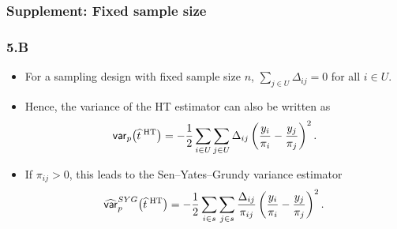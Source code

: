 \documentclass{my_eth_beamer}
\numberwithin{equation}{section}
\newcommand{\NR}{5}
\begin{document}
\subsubsection{Supplement: Fixed sample size}
\begin{frame}
    \frametitle{\NR.\insertsubsectionnumber B~\insertsubsubsection}
    \begin{itemize}
    \setlength{\itemsep}{12pt}
        \item For a sampling design with \alert{fixed sample size} $n$,
            $\sum_{j\in U}\Delta_{ij}=0$ for all $i\in U$.
        \item Hence, the variance of the HT estimator can also be written as
            \begin{equation*}
                \mathsf{var}_p\big(\widehat{t}^{\;\mathrm{HT}}\big) = -\frac{1}{2}
                \sum_{i\in U}\sum_{j\in U}
                \Delta_{ij} \left(
                    \frac{y_i}{\pi_i}-\frac{y_j}{\pi_j}
                \right)^2.
            \end{equation*}
        \item If $\pi_{ij}>0$, this leads to the \alert{Sen--Yates--Grundy}
            \citep[SYG;][]{sen_1953,yates_grundy_1953} variance estimator
            \begin{equation*}
                \widehat{\mathsf{var}}_p^{SYG}\big(\widehat{t}^{\;\mathrm{HT}}\big)
                = -\frac{1}{2} \sum_{i\in s}\sum_{j\in s}
                \frac{\Delta_{ij}}{\pi_{ij}}
                \left( \frac{y_i}{\pi_i}-\frac{y_j}{\pi_j}
                \right)^2.
            \end{equation*}
    \end{itemize}
\end{frame}
\end{document}
